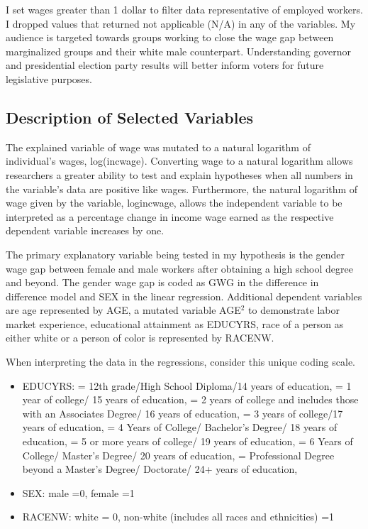 \documentclass[12pt, English]{article}
\begin{document}
I set wages greater than 1 dollar to filter data representative of employed workers. I dropped values that returned not applicable (N/A) in any of the variables. My audience is targeted towards groups working to close the wage gap between marginalized groups and their white male counterpart. Understanding governor and presidential election party results will better inform voters for future legislative purposes.  

\subsection*{Description of Selected Variables}

The explained variable of wage was mutated to a natural logarithm of individual’s wages, log(incwage). Converting wage to a natural logarithm allows researchers a greater ability to test and explain hypotheses when all numbers in the variable's data are positive like wages. Furthermore, the natural logarithm of wage given by the variable, logincwage, allows the independent variable to be interpreted as a percentage change in income wage earned as the respective dependent variable increases by one. 

The primary explanatory variable being tested in my hypothesis is the gender wage gap between female and male workers after obtaining a high school degree and beyond. The gender wage gap is coded as GWG in the difference in difference model and SEX in the linear regression. Additional dependent variables are age represented by AGE, a mutated variable AGE$^2$ to demonstrate labor market experience, educational attainment as EDUCYRS, race of a person as either white or a person of color is represented by RACENW. 

When interpreting the data in the regressions, consider this unique coding scale. 
\begin{itemize}
\item EDUCYRS:  = 12th grade/High School Diploma/14 years of education,  = 1 year of college/ 15 years of education, = 2 years of college and includes those with an Associates Degree/ 16 years of education,  = 3 years of college/17 years of education,  = 4 Years of College/ Bachelor's Degree/ 18 years of education, = 5 or more years of college/ 19 years of education,  = 6 Years of College/ Master's Degree/ 20 years of education,  = Professional Degree beyond a Master's Degree/ Doctorate/ 24+ years of education, \newline

\item SEX: male =0, female =1

\item RACENW: white = 0, non-white (includes all races and ethnicities) =1

\newpage
\end{itemize}
\end{document}

